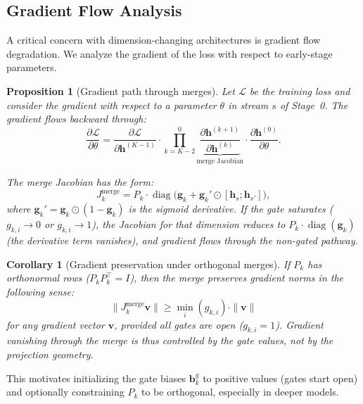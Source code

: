 \documentclass[11pt,a4paper]{article}
\theoremstyle{definition}
\theoremstyle{plain}
\newtheorem{proposition}[definition]{Proposition}
\newtheorem{corollary}[definition]{Corollary}
\theoremstyle{remark}
\newcommand{\Lcal}{\mathcal{L}}
\newcommand{\diag}{\operatorname{diag}}
\begin{document}
\subsection{Gradient Flow Analysis}\label{sec:gradients}

A critical concern with dimension-changing architectures is gradient flow 
degradation. We analyze the gradient of the loss with respect to early-stage 
parameters.

\begin{proposition}[Gradient path through merges]
\label{prop:grad-merge}
Let $\Lcal$ be the training loss and consider the gradient with respect to 
a parameter $\theta$ in stream $s$ of Stage~0. The gradient flows 
backward through:
\begin{equation}
  \frac{\partial \Lcal}{\partial \theta} = 
  \frac{\partial \Lcal}{\partial \mathbf{h}^{(K-1)}} \cdot
  \prod_{k=K-2}^{0} \underbrace{\frac{\partial 
  \mathbf{h}^{(k+1)}}{\partial \mathbf{h}^{(k)}}}_{\text{merge Jacobian}} 
  \cdot \frac{\partial \mathbf{h}^{(0)}}{\partial \theta}.
\end{equation}

The merge Jacobian has the form:
\begin{equation}\label{eq:merge-jacobian}
  J_k^{\text{merge}} = P_k \cdot \diag\bigl(\mathbf{g}_k + 
  \mathbf{g}_k' \odot [\mathbf{h}_s; \mathbf{h}_{s'}]\bigr),
\end{equation}
where $\mathbf{g}_k' = \mathbf{g}_k \odot (1 - \mathbf{g}_k)$ is the 
sigmoid derivative. If the gate saturates ($g_{k,i} \to 0$ or $g_{k,i} 
\to 1$), the Jacobian for that dimension reduces to $P_k \cdot 
\diag(\mathbf{g}_k)$ (the derivative term vanishes), and gradient flows 
through the non-gated pathway.
\end{proposition}

\begin{corollary}[Gradient preservation under orthogonal merges]
If $P_k$ has orthonormal rows ($P_k P_k^\top = I$), then the merge 
preserves gradient norms in the following sense:
\begin{equation}
  \bigl\|J_k^{\text{merge}} \mathbf{v}\bigr\| \geq 
  \min_i(g_{k,i}) \cdot \|\mathbf{v}\|
\end{equation}
for any gradient vector $\mathbf{v}$, provided all gates are open 
($g_{k,i} = 1$). Gradient vanishing through the merge is thus controlled 
by the gate values, not by the projection geometry.
\end{corollary}

This motivates initializing the gate biases $\mathbf{b}_k^g$ to positive 
values (gates start open) and optionally constraining $P_k$ to be 
orthogonal, especially in deeper models.
\end{document}
